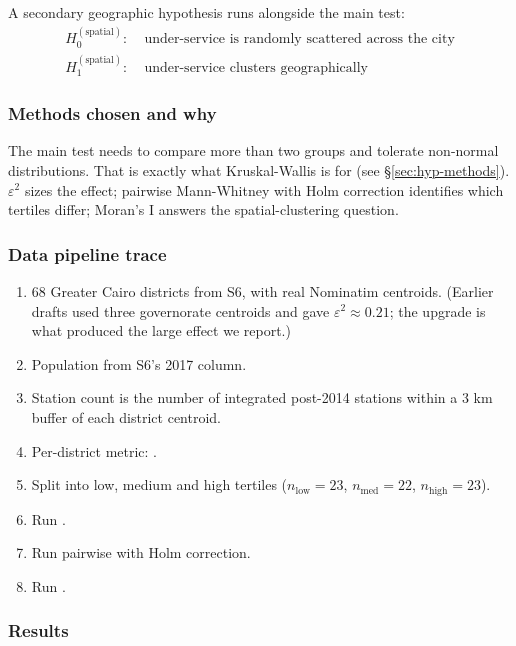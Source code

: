 A secondary geographic hypothesis runs alongside the main test:
\begin{align*}
 H_0^{(\text{spatial})}:\;& \text{under-service is randomly scattered across the city} \\
 H_1^{(\text{spatial})}:\;& \text{under-service clusters geographically}
\end{align*}

\subsubsection{Methods chosen and why}

The main test needs to compare more than two groups and tolerate
non-normal distributions. That is exactly what Kruskal-Wallis is for (see
\S\ref{sec:hyp-methods}). $\varepsilon^2$ sizes the effect; pairwise
Mann-Whitney with Holm correction identifies which tertiles differ;
Moran's I answers the spatial-clustering question.

\subsubsection{Data pipeline trace}

\begin{enumerate}
 \item 68 Greater Cairo districts from S6, with real Nominatim
 centroids. (Earlier drafts used three governorate centroids
 and gave $\varepsilon^2 \approx 0.21$; the upgrade is what
 produced the large effect we report.)
 \item Population from S6's 2017 column.
 \item Station count is the number of integrated post-2014 stations
 within a 3 km buffer of each district centroid.
 \item Per-district metric: .
 \item Split into low, medium and high tertiles
 ($n_\text{low} = 23$, $n_\text{med} = 22$, $n_\text{high} = 23$).
 \item Run .
 \item Run pairwise  with Holm
 correction.
 \item Run .
\end{enumerate}

\subsubsection{Results}

